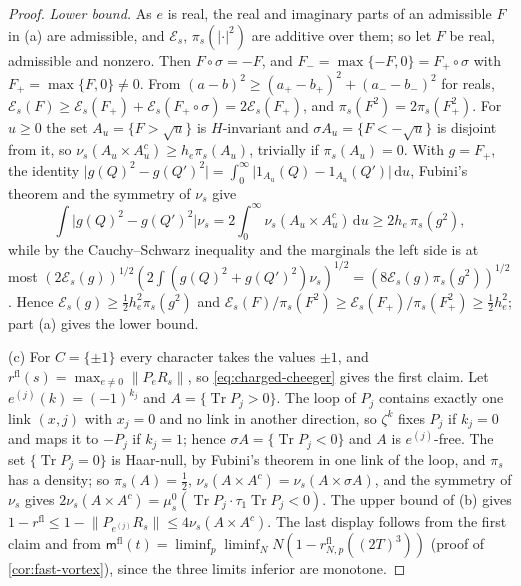 \documentclass[11pt,a4paper]{amsart}
\theoremstyle{definition}
\theoremstyle{remark}
\numberwithin{equation}{section}
\DeclareMathOperator{\Tr}{Tr}        %
\newcommand{\norm}[1]{\lVert #1\rVert}     %
\newcommand{\abs}[1]{\lvert #1\rvert}      %
\newcommand{\dd}{\,\mathrm{d}}             %
\newcommand{\cube}[1]{(2#1)^3}             %
\begin{document}
\begin{proof}
\emph{Lower bound.} As $e$ is real, the real and imaginary parts of an admissible $F$ in (a) are admissible, and $\mathcal E_s$, $\pi_s(\abs\cdot^2)$ are additive over them; so let $F$ be real, admissible and nonzero. Then $F\circ\sigma=-F$, and $F_-=\max\{-F,0\}=F_+\circ\sigma$ with $F_+=\max\{F,0\}\ne0$. From $(a-b)^2\ge(a_+-b_+)^2+(a_--b_-)^2$ for reals, $\mathcal E_s(F)\ge\mathcal E_s(F_+)+\mathcal E_s(F_+\circ\sigma)=2\mathcal E_s(F_+)$, and $\pi_s(F^2)=2\pi_s(F_+^2)$. For $u\ge0$ the set $A_u=\{F>\sqrt u\}$ is $H$-invariant and $\sigma A_u=\{F<-\sqrt u\}$ is disjoint from it, so $\nu_s(A_u\times A_u^c)\ge h_e\pi_s(A_u)$, trivially if $\pi_s(A_u)=0$. With $g=F_+$, the identity $\abs{g(Q)^2-g(Q')^2}=\int_0^\infty\abs{1_{A_u}(Q)-1_{A_u}(Q')}\dd u$, Fubini's theorem and the symmetry of $\nu_s$ give
\[
\int\abs{g(Q)^2-g(Q')^2}\nu_s=2\int_0^\infty\nu_s(A_u\times A_u^c)\dd u\ge2h_e\,\pi_s(g^2),
\]
while by the Cauchy--Schwarz inequality and the marginals the left side is at most $(2\mathcal E_s(g))^{1/2}(2\int(g(Q)^2+g(Q')^2)\nu_s)^{1/2}=(8\mathcal E_s(g)\pi_s(g^2))^{1/2}$. Hence $\mathcal E_s(g)\ge\frac12h_e^2\pi_s(g^2)$ and $\mathcal E_s(F)/\pi_s(F^2)\ge\mathcal E_s(F_+)/\pi_s(F_+^2)\ge\frac12h_e^2$; part (a) gives the lower bound.

(c) For $C=\{\pm1\}$ every character takes the values $\pm1$, and $r^{\mathrm{fl}}(s)=\max_{e\ne0}\norm{P_eR_s}$, so \eqref{eq:charged-cheeger} gives the first claim. Let $e^{(j)}(k)=(-1)^{k_j}$ and $A=\{\Tr P_j>0\}$. The loop of $P_j$ contains exactly one link $(x,j)$ with $x_j=0$ and no link in another direction, so $\zeta^k$ fixes $P_j$ if $k_j=0$ and maps it to $-P_j$ if $k_j=1$; hence $\sigma A=\{\Tr P_j<0\}$ and $A$ is $e^{(j)}$-free. The set $\{\Tr P_j=0\}$ is Haar-null, by Fubini's theorem in one link of the loop, and $\pi_s$ has a density; so $\pi_s(A)=\frac12$, $\nu_s(A\times A^c)=\nu_s(A\times\sigma A)$, and the symmetry of $\nu_s$ gives $2\nu_s(A\times A^c)=\mu^0_s(\Tr P_j\cdot\tau_1\Tr P_j<0)$. The upper bound of (b) gives $1-r^{\mathrm{fl}}\le1-\norm{P_{e^{(j)}}R_s}\le4\nu_s(A\times A^c)$. The last display follows from the first claim and from $\mathsf m^{\mathrm{fl}}(t)=\liminf_p\liminf_NN(1-r^{\mathrm{fl}}_{N,p}(\cube T))$ (proof of \cref{cor:fast-vortex}), since the three limits inferior are monotone.
\end{proof}
\end{document}
